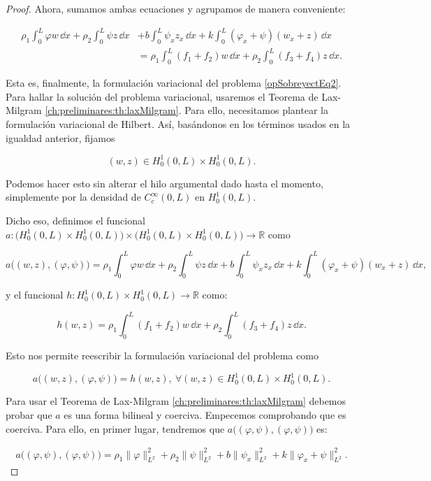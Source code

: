 \begin{proof}
    Ahora, sumamos ambas ecuaciones y agrupamos de manera conveniente:

    \begin{align*}
        \rho_1 \int_0^L \varphi w \, \dd x + \rho_2\int_0^L \psi z \, \dd x &+ b \int_0^L \psi_{x} z_x \, \dd x + k\int_0^L(\varphi_x + \psi)(w_x + z) \, \dd x\\ 
        &= \rho_1\int_0^L (f_1 + f_2) w \, \dd x + \rho_2 \int_0^L (f_3 + f_4) z \, \dd x.
    \end{align*}

    Esta es, finalmente, la formulación variacional del problema \eqref{opSobreyectEq2}. Para hallar la solución del problema variacional, usaremos el Teorema de Lax-Milgram \ref{ch:preliminares:th:laxMilgram}. Para ello, necesitamos plantear la formulación variacional de Hilbert. Así, basándonos en los términos usados en la igualdad anterior, fijamos

    \[(w,z) \in H_0^1(0,L) \times H_0^1(0,L).\]

    Podemos hacer esto sin alterar el hilo argumental dado hasta el momento, simplemente por la densidad de $C_c^\infty(0,L)$ en $H_0^1(0,L)$.

    Dicho eso, definimos el funcional $a : \big(H_0^1(0,L) \times H_0^1(0,L)\big) \times \big(H_0^1(0,L) \times H_0^1(0,L)\big) \rightarrow \mathbb{R}$ como

    \[a\big((w,z),(\varphi, \psi) \big) = \rho_1 \int_0^L \varphi w \, \dd x + \rho_2\int_0^L \psi z \, \dd x + b \int_0^L \psi_{x} z_x \, \dd x + k\int_0^L(\varphi_x + \psi)(w_x + z) \, \dd x,\]

    y el funcional $h : H_0^1(0,L) \times H_0^1(0,L) \rightarrow \mathbb{R}$ como:

    \[h(w,z) = \rho_1\int_0^L (f_1 + f_2) w \, \dd x + \rho_2 \int_0^L (f_3 + f_4) z \, \dd x.\]

    Esto nos permite reescribir la formulación variacional del problema como

    \[a\big((w,z),(\varphi, \psi) \big) = h(w,z), \ \forall (w,z) \in H_0^1(0,L) \times H_0^1(0,L).\]

    Para usar el Teorema de Lax-Milgram \ref{ch:preliminares:th:laxMilgram} debemos probar que $a$ es una forma bilineal y coerciva. Empecemos comprobando que es coerciva. Para ello, en primer lugar, tendremos que $a\big((\varphi, \psi), (\varphi, \psi)\big)$ es:

    \begin{align*}
        a\big((\varphi, \psi), (\varphi, \psi)\big) = \rho_1 \lVert \varphi \rVert^2_{L^2} + \rho_2 \lVert \psi \rVert_{L^2}^2 + b \lVert \psi_x \rVert^2_{L^2} + k \lVert \varphi_x + \psi \rVert_{L^2}^2.
    \end{align*}    


\end{proof}
